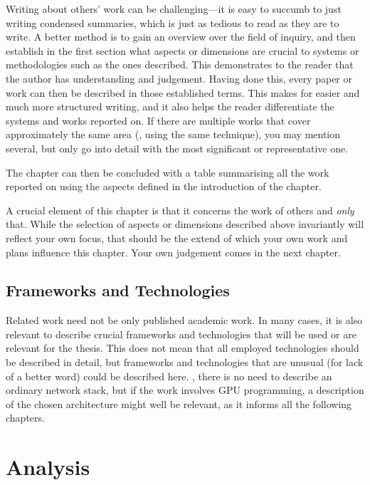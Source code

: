 \documentclass[ twoside,openright,titlepage,numbers=noenddot,headinclude,%
                footinclude=true,cleardoublepage=empty,abstractoff, %
                BCOR=5mm,paper=a4,fontsize=11pt,%
                ngerman,american,%
                ]{scrreprt}
\begin{document}
Writing about others' work can be challenging---it is easy to succumb
to just writing condensed summaries, which is just as tedious to read
as they are to write. A better method is to gain an overview over the
field of inquiry, and then establish in the first section what aspects
or dimensions are crucial to systems or methodologies such as the ones
described. This demonstrates to the reader that the author has
understanding and judgement. Having done this, every paper or work can
then be described in those established terms. This makes for easier
and much more structured writing, and it also helps the reader
differentiate the systems and works reported on. If there are multiple
works that cover approximately the same area (\eg, using the same
technique), you may mention several, but only go into detail with the
most significant or representative one.

The chapter can then be concluded with a table summarising all the
work reported on using the aspects defined in the introduction of the
chapter.

A crucial element of this chapter is that it concerns the work of
others and \emph{only} that. While the selection of aspects or
dimensions described above invariantly will reflect your own focus,
that should be the extend of which your own work and plans influence
this chapter.  Your own judgement comes in the next chapter.

\section{Frameworks and Technologies}
\label{sec:fram-techn}

Related work need not be only published academic work. In many cases,
it is also relevant to describe crucial frameworks and technologies
that will be used or are relevant for the thesis.  This does not mean
that all employed technologies should be described in detail, but
frameworks and technologies that are unusual (for lack of a better
word) could be described here. \Eg, there is no need to describe an
ordinary network stack, but if the work involves GPU programming, a
description of the chosen architecture might well be relevant, as it
informs all the following chapters.



\chapter{Analysis}
\label{cha:analysis}
\end{document}
